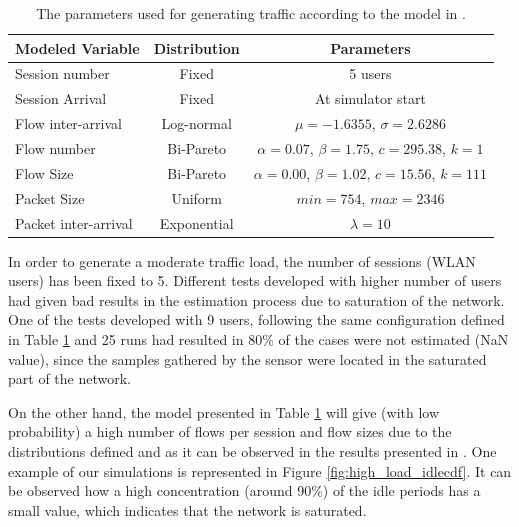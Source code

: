 \begin{table}[htb]
	\begin{center}
		\begin{tabular}{ l | c | c }
			Modeled Variable & Distribution & Parameters \\ \hline
			Session number	& Fixed & 5 users \\
			Session Arrival	 & Fixed & At simulator start \\
			Flow inter-arrival & Log-normal & $\mu = -1.6355$, $\sigma = 2.6286$ \\
			Flow number & Bi-Pareto & $\alpha = 0.07$, $\beta = 1.75$, $c = 295.38$, $k = 1$ \\
			Flow Size & Bi-Pareto & $\alpha = 0.00$, $\beta = 1.02$, $c = 15.56$, $k = 111$ \\
			Packet Size & Uniform & $min = 754$, $max = 2346$ \\
			Packet inter-arrival & Exponential & $\lambda = 10$ \\
		\end{tabular}
		\caption{The parameters used for generating traffic according to the model in \cite{Campus-WLAN}.}
		\label{tab:sim_traffic_model}
	\end{center}
\end{table}

In order to generate a moderate traffic load, the number of sessions (\acs{WLAN} users) has been fixed to 5. Different tests developed with higher number of users had given bad results in the estimation process due to saturation of the network. One of the tests developed with 9 users, following the same configuration defined in Table \ref{tab:sim_traffic_model} and 25 runs had resulted in 80\% of the cases were not estimated (NaN value), since the samples gathered by the sensor were located in the saturated part of the network.

On the other hand, the model presented in Table \ref{tab:sim_traffic_model} will give (with low probability) a high number of flows per session and flow sizes due to the distributions defined and as it can be observed in the results presented in \cite{Campus-WLAN}. One example of our simulations is represented in Figure \ref{fig:high_load_idlecdf}. It can be observed how a high concentration (around 90\%) of the idle periods has a small value, which indicates that the network is saturated. 

